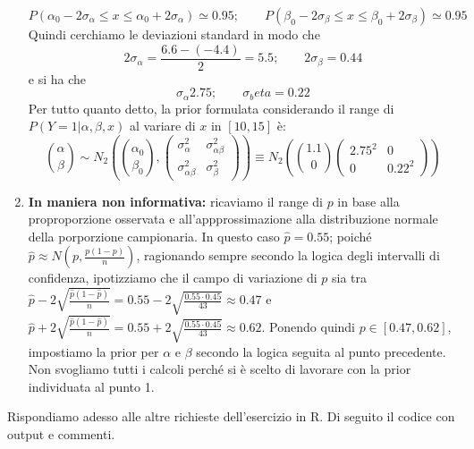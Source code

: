 \begin{enumerate}
   $$P(\alpha_0 - 2\sigma_\alpha \leq x \leq \alpha_0 + 2\sigma_\alpha) \simeq 0.95; \qquad P(\beta_0 - 2\sigma_\beta \leq x \leq \beta_0 + 2\sigma_\beta) \simeq 0.95$$
   Quindi cerchiamo le deviazioni standard in modo che
   $$2\sigma_\alpha =  \frac{6.6 - (-4.4)}{2} = 5.5; \qquad 2\sigma_\beta = 0.44$$
   e si ha che
   $$\sigma_\alpha 2.75; \qquad \sigma_beta = 0.22$$
   Per tutto quanto detto, la prior formulata considerando il range di $P(Y=1 | \alpha, \beta, x)$ al variare di $x$ in $[10, 15]$ è:
   $$\binom{\alpha}{\beta} \sim N_2\left(\binom{\alpha_0}{\beta_0},
   \begin{pmatrix}
    \sigma^2_\alpha & \sigma^2_{\alpha\beta} \\
    \sigma^2_{\alpha\beta} & \sigma^2_\beta

    \end{pmatrix}\right) \equiv N_2 \left(\binom{1.1}{0} \begin{pmatrix} 2.75^2 & 0 \\ 0 & 0.22^2 \end{pmatrix}\right)$$

    \item \textbf{In maniera non informativa:} ricaviamo il range di $p$ in base alla proproporzione osservata e all'appprossimazione alla distribuzione normale della porporzione campionaria. In questo caso $\hat p = 0.55$; poiché $\hat p \approx N(p, \frac{p(1-p)}{n})$, ragionando sempre secondo la logica degli intervalli di confidenza, ipotizziamo che il campo di variazione di $p$ sia tra $\hat p - 2 \sqrt{\frac{\hat p (1-\hat p)}{n}} = 0.55 - 2 \sqrt{\frac{0.55 \cdot 0.45}{43}} \approx 0.47$ e $\hat p + 2 \sqrt{\frac{\hat p (1-\hat p)}{n}} = 0.55 + 2 \sqrt{\frac{0.55 \cdot 0.45}{43}} \approx 0.62$. Ponendo quindi $p \in [0.47, 0.62]$, impostiamo la prior per $\alpha$ e $\beta$ secondo la logica seguita al punto precedente. Non svogliamo tutti i calcoli perché si è scelto di lavorare con la prior individuata al punto 1.
\end{enumerate}
Rispondiamo adesso alle altre richieste dell'esercizio in R. Di seguito il codice con output e commenti.






